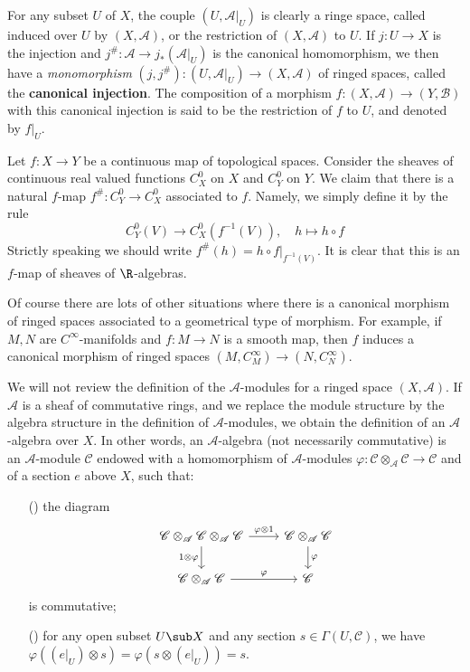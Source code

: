 For any subset $U$ of $X$, the couple $(U,\mathscr{A}|_U)$ is clearly a ringe space, called induced over $U$ by $(X,\mathscr{A})$, or the restriction of $(X,\mathscr{A})$ to $U$. If $j:U\to X$ is the injection and $j^{\#}:\mathscr{A}\to j_*(\mathscr{A}|_U)$ is the canonical homomorphism, we then have a \textit{monomorphism} $(j,j^{\#}):(U,\mathscr{A}|_U)\to(X,\mathscr{A})$ of ringed spaces, called the \textbf{canonical injection}. The composition of a morphism $f:(X,\mathscr{A})\to(Y,\mathscr{B})$ with this canonical injection is said to be the restriction of $f$ to $U$, and denoted by $f|_U$.
\begin{example}
Let $f:X\to Y$ be a continuous map of topological spaces. Consider the sheaves of continuous real valued functions $C^0_X$ on $X$ and $C^0_Y$ on $Y$. We claim that there is a natural $f$-map $f^{\#}:C^0_Y\to C^0_X$ associated to $f$. Namely, we simply define it by the rule
\[C^0_Y(V)\to C^0_X(f^{-1}(V)),\quad h\mapsto h\circ f\]
Strictly speaking we should write $f^{\#}(h)=h\circ f|_{f^{-1}(V)}$. It is clear that this is an $f$-map of sheaves of $\R$-algebras.\par
Of course there are lots of other situations where there is a canonical morphism of ringed spaces associated to a geometrical type of morphism. For example, if $M,N$ are $C^\infty$-manifolds and $f:M\to N$ is a smooth map, then $f$ induces a canonical morphism of ringed spaces $(M,C^\infty_M)\to(N,C^\infty_N)$.
\end{example}
We will not review the definition of the $\mathscr{A}$-modules for a ringed space $(X,\mathscr{A})$. If $\mathscr{A}$ is a sheaf of commutative rings, and we replace the module structure by the algebra structure in the definition of $\mathscr{A}$-modules, we obtain the definition of an $\mathscr{A}$-algebra over $X$. In other words, an $\mathscr{A}$-algebra (not necessarily commutative) is an $\mathscr{A}$-module $\mathscr{C}$ endowed with a homomorphism of $\mathscr{A}$-modules $\varphi:\mathscr{C}\otimes_{\mathscr{A}}\mathscr{C}\to\mathscr{C}$ and of a section $e$ above $X$, such that:
\begin{itemize}
\item[(\rmnum{1})] the diagram 
\[\begin{tikzcd}
\mathscr{C}\otimes_{\mathscr{A}}\mathscr{C}\otimes_{\mathscr{A}}\mathscr{C}\ar[d,swap,"1\otimes\varphi"]\ar[r,"\varphi\otimes 1"]&\mathscr{C}\otimes_{\mathscr{A}}\mathscr{C}\ar[d,"\varphi"]\\
\mathscr{C}\otimes_{\mathscr{A}}\mathscr{C}\ar[r,"\varphi"]&\mathscr{C}
\end{tikzcd}\]
is commutative;
\item[(\rmnum{2})] for any open subset $U\sub X$ and any section $s\in\Gamma(U,\mathscr{C})$, we have $\varphi((e|_U)\otimes s)=\varphi(s\otimes(e|_U))=s$. 
\end{itemize} 
